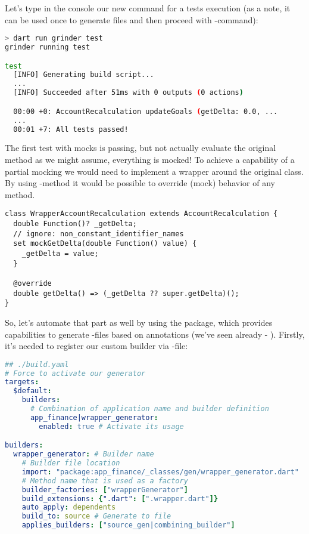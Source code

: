 \noindent Let's type in the console our new command for a tests execution (as a note, it can be used once to generate 
files and then proceed with -command):

\begin{lstlisting}[language=bash]
> dart run grinder test
grinder running test

test
  [INFO] Generating build script...
  ...
  [INFO] Succeeded after 51ms with 0 outputs (0 actions)

  00:00 +0: AccountRecalculation updateGoals (getDelta: 0.0, ...
  ...
  00:01 +7: All tests passed!
\end{lstlisting}

\noindent The first test with mocks is passing, but not actually evaluate the original method as we might assume, 
everything is mocked! To achieve a capability of a partial mocking we would need to implement a wrapper around the 
original class. By using -method it would be possible to override (mock) behavior of any method. 

\begin{lstlisting}
class WrapperAccountRecalculation extends AccountRecalculation {
  double Function()? _getDelta;
  // ignore: non_constant_identifier_names
  set mockGetDelta(double Function() value) {
    _getDelta = value;
  }

  @override
  double getDelta() => (_getDelta ?? super.getDelta)();
}
\end{lstlisting}

\noindent So, let's automate that part as well by using the  package, which provides capabilities to 
generate -files based on annotations (we've seen already - ). Firstly, it's needed to 
register our custom builder via -file:

\begin{lstlisting}[language=yaml]
## ./build.yaml
# Force to activate our generator
targets:
  $default:
    builders: 
      # Combination of application name and builder definition
      app_finance|wrapper_generator:
        enabled: true # Activate its usage

builders:
  wrapper_generator: # Builder name
    # Builder file location
    import: "package:app_finance/_classes/gen/wrapper_generator.dart"
    # Method name that is used as a factory
    builder_factories: ["wrapperGenerator"]
    build_extensions: {".dart": [".wrapper.dart"]}
    auto_apply: dependents
    build_to: source # Generate to file
    applies_builders: ["source_gen|combining_builder"]
\end{lstlisting}


